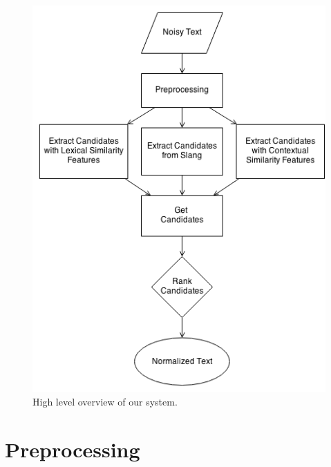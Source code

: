 \documentclass[a4paper,onesided,12pt]{report}
\begin{document}
\begin{figure}[htb]
\begin{center}
\includegraphics[scale=0.6]{fig/overview}
\caption{High level overview of our system.}
\label{fig:overview}
\end{center}
\end{figure}

\section{Preprocessing}

\end{document}
